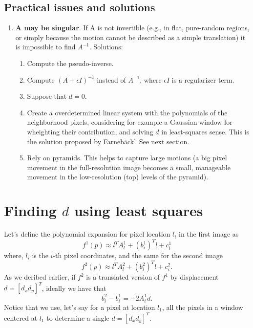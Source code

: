 \subsection{Practical issues and solutions}
\begin{enumerate}
\item \textbf{A may be singular}. If A is not invertible (e.g., in flat, pure-random regions, or simply because the motion cannot be described as a simple translation) it is impossible to find $A^{-1}$. Solutions:
  \begin{enumerate}
  \item Compute the pseudo-inverse.
  \item Compute $(A+\epsilon I)^{-1}$ instead of $A^{-1}$, where
    $\epsilon I$ is a regularizer term.
  \item Suppose that $d=0$.
  \item Create a overdetermined linear system with the polynomials of
    the neighborhood pixels, considering for example a Gaussian window
    for wheighting their contribution, and solving $d$ in
    least-squares sense. This is the solution proposed by
    Farneb\"ack'. See next section.
  \item Rely on pyramids. This helps to capture large motions (a big
    pixel movement in the full-resolution image becomes a small,
    manageable movement in the low-resolution (top) levels of the
    pyramid).
  \end{enumerate}
\end{enumerate}

\section*{Finding $d$ using least squares}
Let's define the polynomial expansion for pixel location $l_i$ in the first image as
\begin{equation}
  f^1(p) \approx l^TA_l^1 + {(b_i^1)}^Tl + c_i^1
\end{equation}
where, $l_i$ is the $i$-th pixel coordinates, and the same for the second image
\begin{equation}
  f^2(p) \approx l^TA_l^2 + {(b_i^2)}^Tl + c_i^2.
\end{equation}  
As we deribed earlier, if $f^2$ is a translated version of $f^1$ by displacement $d=[d_x d_y]^T$, ideally we have that
\begin{equation}
  b^2_i-b^1_i = -2A^1_id.
\end{equation}
Notice that we use, let's say for a pixel at location $l_1$, all the pixels in a window centered at $l_1$ to determine a single $d=[d_x d_y]^T$.

